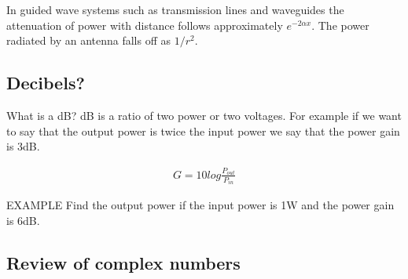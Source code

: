 In guided wave systems such as transmission lines and waveguides the attenuation of power with distance follows approximately $e^{-2\alpha x}$. The power radiated by an antenna falls off as $1/r^{2}$.


\subsection{Decibels?}

What is a dB? dB is a ratio of two power or two voltages. For example if we want to say that the output power is twice the input power we say that the power gain is 3dB.

\begin{eqnarray}
G=10 log \frac{P_{out}}{P_{in}}
\end{eqnarray}


{\large{EXAMPLE}} Find the output power if the input power is 1W and the power gain is 6dB.


\subsection{Review of complex numbers}

